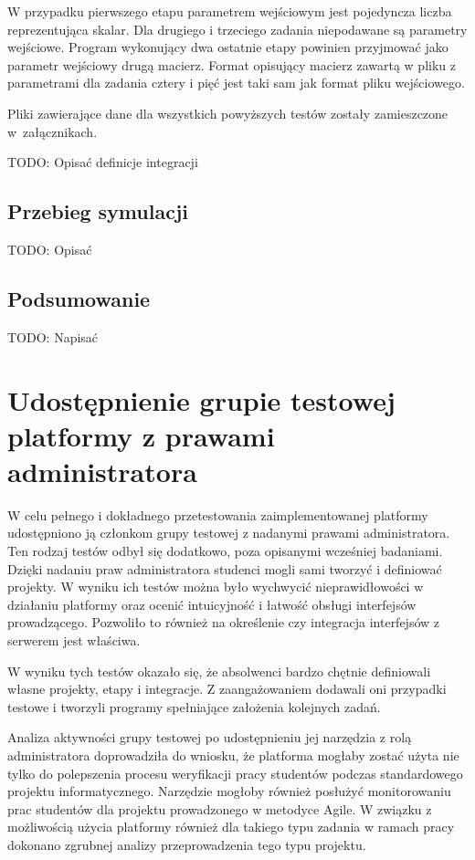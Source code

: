 W przypadku pierwszego etapu parametrem wejściowym jest pojedyncza liczba reprezentująca skalar.
Dla drugiego i trzeciego zadania niepodawane są parametry wejściowe.
Program wykonujący dwa ostatnie etapy powinien przyjmować jako parametr wejściowy drugą macierz.
Format opisujący macierz zawartą w pliku z parametrami dla zadania cztery i pięć jest taki sam jak format pliku wejściowego.

Pliki zawierające dane dla wszystkich powyższych testów zostały zamieszczone w~załącznikach.

TODO: Opisać definicje integracji

\subsection{Przebieg symulacji}
\label{matrix_simulation}

TODO: Opisać


\subsection{Podsumowanie}

TODO: Napisać


\section{Udostępnienie grupie testowej platformy z prawami administratora}

W celu pełnego i dokładnego przetestowania zaimplementowanej platformy udostępniono ją członkom grupy testowej z nadanymi prawami administratora.
Ten rodzaj testów odbył się dodatkowo, poza opisanymi wcześniej badaniami.
Dzięki nadaniu praw administratora studenci mogli sami tworzyć i definiować projekty.
W wyniku ich testów można było wychwycić nieprawidłowości w działaniu platformy oraz ocenić intuicyjność i łatwość obsługi interfejsów prowadzącego.
Pozwoliło to również na określenie czy integracja interfejsów z serwerem jest właściwa.

W wyniku tych testów okazało się, że absolwenci bardzo chętnie definiowali własne projekty, etapy i integracje.
Z zaangażowaniem dodawali oni przypadki testowe i tworzyli programy spełniające założenia kolejnych zadań.

Analiza aktywności grupy testowej po udostępnieniu jej narzędzia z rolą administratora doprowadziła do wniosku, że platforma mogłaby zostać użyta nie tylko do polepszenia procesu weryfikacji pracy studentów podczas standardowego projektu informatycznego.
Narzędzie mogłoby również posłużyć monitorowaniu prac studentów dla projektu prowadzonego w metodyce Agile.
W związku z możliwością użycia platformy również dla takiego typu zadania w ramach pracy dokonano zgrubnej analizy przeprowadzenia tego typu projektu.


